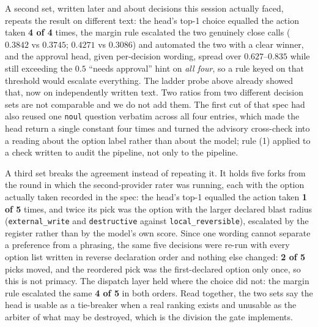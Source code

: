 \documentclass[10pt,twocolumn]{article}
\begin{document}
A second set, written later and about decisions this session actually faced, repeats the
result on different text: the head's top-1 choice equalled the action taken \textbf{4 of
4} times, the margin rule escalated the two genuinely close calls ($0.3842$ vs $0.3745$;
$0.4271$ vs $0.3086$) and automated the two with a clear winner, and the approval head,
given per-decision wording, spread over $0.627$--$0.835$ while still exceeding the
$0.5$ ``needs approval'' hint on \emph{all four}, so a rule keyed on that threshold
would escalate everything. The ladder probe above already showed that, now on
independently written text. Two ratios
from two different decision sets are not comparable and we do not add them. The first cut
of that spec had also reused one \texttt{noul} question verbatim across all four entries,
which made the head return a single constant four times and turned the advisory
cross-check into a reading about the option label rather than about the model; rule (1)
applied to a check written to audit the pipeline, not only to the pipeline.

A third set breaks the agreement instead of repeating it. It holds five forks from the
round in which the second-provider rater was running, each with the option actually taken
recorded in the spec: the head's top-1 equalled the action taken \textbf{1 of 5} times, and
twice its pick was the option with the larger declared blast radius (\texttt{external\_write}
and \texttt{destructive} against \texttt{local\_reversible}), escalated by the register
rather than by the model's own score. Since one wording cannot separate a preference from a
phrasing, the same five decisions were re-run with every option list written in reverse
declaration order and nothing else changed: \textbf{2 of 5} picks moved, and the reordered
pick was the first-declared option only once, so this is not primacy. The dispatch layer
held where the choice did not: the margin rule escalated the same \textbf{4 of 5} in both
orders. Read together, the two sets say the head is usable as a tie-breaker when a real
ranking exists and unusable as the arbiter of what may be destroyed, which is the
division the gate implements.
\end{document}
